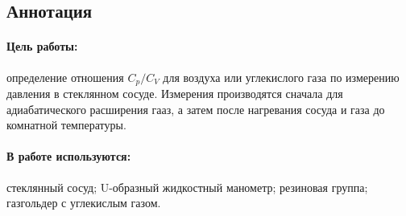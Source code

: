 \documentclass[a4paper,12pt]{report}
\begin{document}
    
    \newpage
    \pagestyle{fancy}

    \fancyhead{}
    \fancyfoot{}
    \fancyhead[L]{\rightmark}
    \fancyhead[R]{\thepage}

    
    \subsection*{Аннотация}
        \paragraph*{Цель работы: } определение отношения $C_p/C_V$ для воздуха или углекислого газа по измерению давления в стеклянном сосуде. Измерения производятся сначала для адиабатического расширения гааз, а затем после нагревания сосуда и газа до комнатной температуры.
        \paragraph*{В работе используются:} стеклянный сосуд; U-образный жидкостный манометр; резиновая группа; газгольдер с углекислым газом.
    
\end{document}
